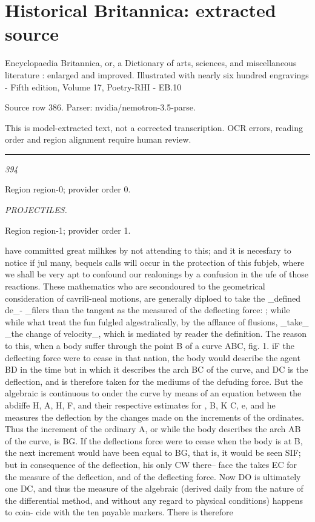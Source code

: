 \documentclass[11pt]{article}
\begin{document}
\section*{Historical Britannica: extracted source}
Encyclopaedia Britannica, or, a Dictionary of arts, sciences, and miscellaneous literature : enlarged and improved. Illustrated with nearly six hundred engravings - Fifth edition, Volume 17, Poetry-RHI - EB.10\par
{\small Source row 386. Parser: nvidia/nemotron-3.5-parse.\par}
{\small This is model-extracted text, not a corrected transcription. OCR errors, reading order and region alignment require human review.\par}
\hrule\medskip
{\small\itshape 394\par}

{\scriptsize\color{gray} Region region-0; provider order 0.\par}
\medskip

{\small\itshape PROJECTILES.\par}

{\scriptsize\color{gray} Region region-1; provider order 1.\par}
\medskip

have committed great milhkes by not attending to this; and it is necesfary to notice if jul many, bequels calls will occur in the protection of this fubjeb, where we shall be very apt to confound our realonings by a confusion in the ufe of those reactions. These mathematics who are secondoured to the geometrical consideration of cavrili-neal motions, are generally diploed to take the \_defined de\_- \_filers than the tangent as the measured of the deflecting force: ; while while what treat the fun fulgled algestralically, by the afflance of flusions, \_take\_ \_the change of velocity\_, which is mediated by reader the definition. The reason to this, when a body suffer through the point B of a curve ABC, fig. 1. iF the deflecting force were to cease in that nation, the body would describe the agent BD in the time but in which it describes the arch BC of the curve, and DC is the deflection, and is therefore taken for the mediums of the defuding force. But the algebraic is continuous to onder the curve by means of an equation between the abdiffe H, A, H, F, and their respective estimates for , B, K C, e, and he measures the deflection by the changes made on the increments of the ordinates. Thus the increment of the ordinary A, or while the body describes the arch AB of the curve, is BG. If the deflections force were to cease when the body is at B, the next increment would have been equal to BG, that is, it would be seen SIF; but in consequence of the deflection, his only CW there– face the takes EC for the measure of the deflection, and of the deflecting force. Now DO is ultimately one DC, and thus the measure of the algebraic (derived daily from the nature of the differential method, and without any regard to physical conditions) happens to coin- cide with the ten payable markers. There is therefore
\par
\end{document}
